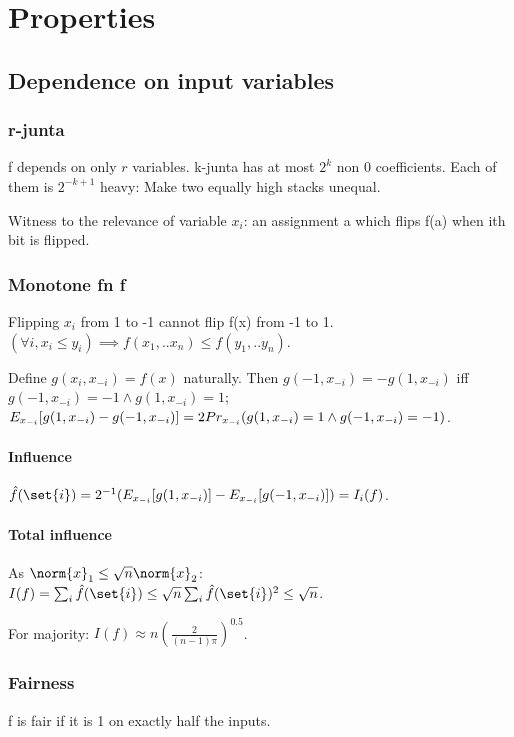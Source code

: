 \documentclass[oneside, article]{memoir}
\begin{document}
\chapter{Properties}
\section{Dependence on input variables}
\subsection{r-junta}
f depends on only $r$ variables. k-junta has at most $2^k$ non 0 coefficients. Each of them is $2^{-k+1}$ heavy: Make two equally high stacks unequal.

Witness to the relevance of variable $x_{i}$: an assignment a which flips f(a) when ith bit is flipped.

\subsection{Monotone fn f}
Flipping $x_{i}$ from 1 to -1 cannot flip f(x) from -1 to 1. $(\forall i, x_{i} \leq y_{i}) \implies f(x_{1}, .. x_{n}) \leq f(y_{1}, .. y_{n})$.

Define $g(x_{i}, x_{-i}) = f(x)$ naturally. Then $g(-1,x_{-i}) = -g(1,x_{-i})$ iff \\
$g(-1,x_{-i}) = -1 \land g(1,x_{-i}) = 1$;\\ $E_{x_{-i}}[g(1,x_{-i}) - g(-1,x_{-i})] = 2 Pr_{x_{-i}}(g(1,x_{-i}) \\
= 1 \land g(-1,x_{-i}) = -1 ) $.

\subsubsection{Influence}
$\hat{f}(\set{i}) = 2^{-1}(E_{x_{-i}}[g(1,x_{-i})] - E_{x_{-i}}[g(-1,x_{-i})]) = I_{i}(f)$.

\subsubsection{Total influence}
As $\norm{x}_{1} \leq \sqrt{n}\norm{x}_{2}$: $I(f) = \sum_{i} \hat{f}(\set{i}) \leq \sqrt{n}\sum_{i} \hat{f}(\set{i})^{2} \leq \sqrt{n}$.

For majority: $I(f) \approx n(\frac{2}{(n-1)\pi})^{0.5}$.

\subsection{Fairness}
f is fair if it is 1 on exactly half the inputs.
\end{document}
